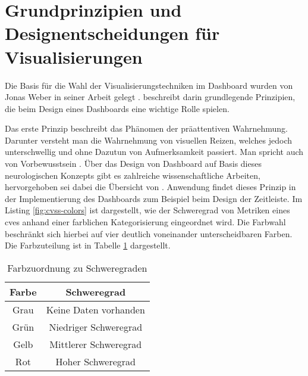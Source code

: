 \section{Grundprinzipien und Designentscheidungen für Visualisierungen}
\label{sec:auswahlDerVisualisierungstechniken}
Die Basis für die Wahl der Visualisierungstechniken im Dashboard wurden von Jonas Weber in seiner Arbeit gelegt \autocite{weberEvaluationDashboardTechniques}. \citeauthor{weberEvaluationDashboardTechniques} beschreibt darin grundlegende Prinzipien, die beim Design eines Dashboards eine wichtige Rolle spielen.
\par Das erste Prinzip beschreibt das Phänomen der präattentiven Wahrnehmung. Darunter versteht man die Wahrnehmung von visuellen Reizen, welches jedoch unterschwellig und ohne Dazutun von Aufmerksamkeit passiert. Man spricht auch von Vorbewusstsein \autocite{PraeattentiveWahrnehmung,mallotWahrnehmungPraeattentiveIm2021}. Über das Design von Dashboard auf Basis dieses neurologischen Konzepts gibt es zahlreiche wissenschaftliche Arbeiten, hervorgehoben sei dabei die Übersicht von \citeauthor{barrera-leonHowPreattentiveProcess2023} \autocite{barrera-leonHowPreattentiveProcess2023}. Anwendung findet dieses Prinzip in der Implementierung des Dashboards zum Beispiel beim Design der Zeitleiste. Im Listing \ref{fig:cvss-colors} ist dargestellt, wie der Schweregrad von Metriken eines \glspl{cve} anhand einer farblichen Kategorisierung eingeordnet wird. Die Farbwahl beschränkt sich hierbei auf vier deutlich voneinander unterscheidbaren Farben. Die Farbzuteilung ist in Tabelle \ref{tab:severity-color-mapping} dargestellt.
\begin{table}[H]
    \centering
    \caption{Farbzuordnung zu Schweregraden}
    \begin{tabular}{|c|c|}
        \hline
        \textbf{Farbe}                & \textbf{Schweregrad}  \\
        \hline
        \cellcolor[HTML]{6c757d} Grau & Keine Daten vorhanden \\
        \hline
        \cellcolor[HTML]{198754} Grün & Niedriger Schweregrad \\
        \hline
        \cellcolor[HTML]{ffc107} Gelb & Mittlerer Schweregrad \\
        \hline
        \cellcolor[HTML]{dc3545} Rot  & Hoher Schweregrad      \\
        \hline
    \end{tabular}
    \label{tab:severity-color-mapping}
\end{table}

